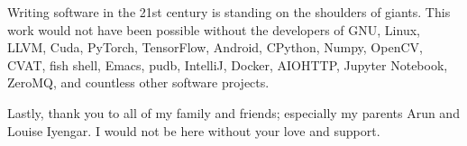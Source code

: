 \documentclass[12pt]{cmuthesis}
\begin{document}
\begin{acknowledgments}
  Writing software in the 21st century is standing on the shoulders of giants.
  This work would not have been possible without the developers of GNU, Linux,
  LLVM, Cuda, PyTorch, TensorFlow, Android, CPython, Numpy, OpenCV, CVAT, fish
  shell, Emacs, pudb, IntelliJ, Docker, AIOHTTP, Jupyter Notebook, ZeroMQ, and
  countless other software projects.

  Lastly, thank you to all of my family and friends;
  especially my parents Arun and Louise Iyengar.
  I would not be here without your love and support.
\end{acknowledgments}

\tableofcontents
\listoffigures
\listoftables
\mainmatter


%
%
%
%
%









\backmatter

\renewcommand{\bibsection}{\chapter{\bibname}}




\end{document}
